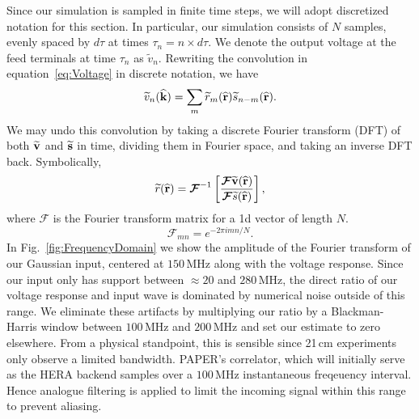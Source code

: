\documentclass[twocolumn]{emulateapj}
\begin{document}
Since our simulation is sampled in finite time steps, we will adopt discretized notation for this section. In particular, our simulation consists of $N$ samples, evenly spaced by $d \tau$ at times $\tau_n = n \times d \tau$. 
We denote the output voltage at the feed terminals at time $\tau_n$ as $\widetilde{v}_n$. Rewriting the convolution in equation~\ref{eq:Voltage} in discrete notation, we have
\begin{equation}
\ftv_n({\bf \widehat{k}}) = \sum_m \ftr_m(\bl) \fts_{n-m}(\bl).
\end{equation}
We may undo this convolution by taking a discrete Fourier transform (DFT) of both ${\bf \widetilde{v}}$ and ${\bf \widetilde{s}}$ in time, dividing them in Fourier space, and taking an inverse DFT back. Symbolically,
\begin{equation}\label{eq:Inversion}
\ftr(\bl) = \boldsymbol{\mathcal{F}}^{-1} \left[ \frac{\boldsymbol{\mathcal{F}} {\bf \widetilde{v}}(\bl)}{\boldsymbol{\mathcal{F}}{\fts}(\bl)} \right] ,
\end{equation}
where $\boldsymbol{\mathcal{F}}$ is the Fourier transform matrix for a 1d vector of length $N$. 
\begin{equation}
\boldsymbol{\mathcal{F}}_{mn} = e^{-2 \pi i m n /N}.
\end{equation}
In Fig.~\ref{fig:FrequencyDomain} we show the amplitude of the Fourier transform of our Gaussian input, centered at $150$\,MHz along with the voltage response. Since our input only has support between $\approx 20$ and $280$\,MHz, the direct ratio of our voltage response and input wave is dominated by numerical noise outside of this range. We eliminate these artifacts by multiplying our ratio by a Blackman-Harris window between $100$\,MHz and $200$\,MHz and set our estimate to zero elsewhere. From a physical standpoint, this is sensible since 21\,cm experiments only observe a limited bandwidth. PAPER's correlator, which will initially serve as the HERA backend samples over a $100$\,MHz instantaneous freqeuency interval. Hence analogue filtering is applied to limit the incoming signal within this range to prevent aliasing.
\end{document}
